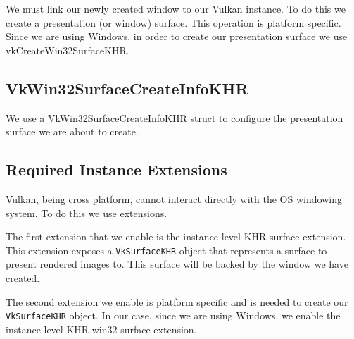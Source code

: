 We must link our newly created window to our Vulkan instance.
To do this we create a presentation (or window) surface.
This operation is platform specific.
Since we are using Windows, in order to create our presentation surface we
use vkCreateWin32SurfaceKHR.

\begin{minipage}{\linewidth}{\noindent}
    
\end{minipage}

\subsection{VkWin32SurfaceCreateInfoKHR}

We use a VkWin32SurfaceCreateInfoKHR struct to configure the presentation
surface we are about to create.

\begin{minipage}{\linewidth}{\noindent}
    
\end{minipage}

\subsection{Required Instance Extensions}

Vulkan, being cross platform, cannot interact directly with the OS windowing system.
To do this we use extensions.

The first extension that we enable is the instance level KHR surface extension.
This extension exposes a \texttt{VkSurfaceKHR} object that represents a surface to present
rendered images to.
This surface will be backed by the window we have created.

The second extension we enable is platform specific and is needed
to create our \texttt{VkSurfaceKHR} object.
In our case, since we are using Windows, we enable the instance level KHR win32
surface extension.

\begin{minipage}{\linewidth}{\noindent}
    
\end{minipage}

